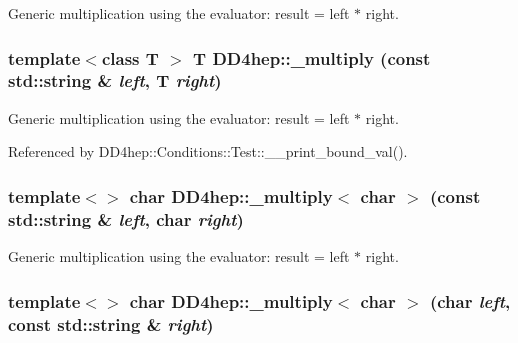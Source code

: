 Generic multiplication using the evaluator: result = left $\ast$ right. \hypertarget{group___d_d4_h_e_p___g_e_o_m_e_t_r_y_ga3a15f19b6f0559fc4561cb6906f56110}{
\subsubsection[{\_\-multiply}]{\setlength{\rightskip}{0pt plus 5cm}template$<$class T $>$ {\bf T} DD4hep::\_\-multiply (const std::string \& {\em left}, \/  {\bf T} {\em right})}}
\label{group___d_d4_h_e_p___g_e_o_m_e_t_r_y_ga3a15f19b6f0559fc4561cb6906f56110}


Generic multiplication using the evaluator: result = left $\ast$ right. 

Referenced by DD4hep::Conditions::Test::\_\-\_\-print\_\-bound\_\-val().\hypertarget{group___d_d4_h_e_p___g_e_o_m_e_t_r_y_ga52998bcba1b4b9f74a9c1abb9bd091ac}{
\subsubsection[{\_\-multiply$<$ char $>$}]{\setlength{\rightskip}{0pt plus 5cm}template$<$$>$ char DD4hep::\_\-multiply$<$ char $>$ (const std::string \& {\em left}, \/  char {\em right})}}
\label{group___d_d4_h_e_p___g_e_o_m_e_t_r_y_ga52998bcba1b4b9f74a9c1abb9bd091ac}


Generic multiplication using the evaluator: result = left $\ast$ right. \hypertarget{group___d_d4_h_e_p___g_e_o_m_e_t_r_y_ga7d24403c93188d1f80fcac01bf79d654}{
\subsubsection[{\_\-multiply$<$ char $>$}]{\setlength{\rightskip}{0pt plus 5cm}template$<$$>$ char DD4hep::\_\-multiply$<$ char $>$ (char {\em left}, \/  const std::string \& {\em right})}}
\label{group___d_d4_h_e_p___g_e_o_m_e_t_r_y_ga7d24403c93188d1f80fcac01bf79d654}


